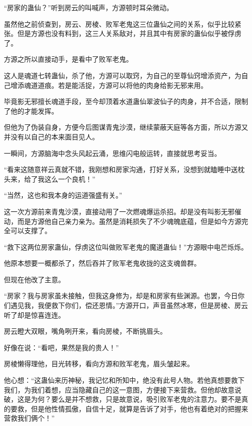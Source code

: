 
\begin{this_body}



“房家的蛊仙？”听到房云的叫喊声，方源顿时耳朵微动。

虽然他之前侦查到，房云、房棱、败军老鬼这三位蛊仙之间的关系，似乎比较紧张。但是方源也没有料到，这三人关系敌对，并且其中有房家的蛊仙似乎被俘虏了。

方源之所以直接动手，是看中了败军老鬼。

这人是魂道七转蛊仙，杀了他，方源可以取窍，为自己的至尊仙窍增添资产，为自己增添魂道道痕。若是能活捉，方源可以将他的肉身给影无邪来用。

毕竟影无邪擅长魂道手段，至今却顶着水道蛊仙翠波仙子的肉身，并不合适，限制了他的才能发挥。

但他为了伪装自身，方便今后图谋青鬼沙漠，继续蒙蔽天庭等各方面，所以方源又并没有以自己的本来面目见人。

一瞬间，方源脑海中念头风起云涌，思维闪电般运转，直接就思考妥当。

“看来这随意祥云真就不错，我刚想和房家沟通，打好关系，没想到就瞌睡中送枕头来，给了我这么一个良机！”

“当然，这也和我本身的运道强盛有关。”

这一次方源前来青鬼沙漠，直接动用了一次燃魂爆运杀招。却是没有叫影无邪催动，而是方源他自己亲力亲为。虽然是消耗损失了不少魂魄底蕴，但是如今方源完全可以支撑了。

“救下这两位房家蛊仙，俘虏这位叫做败军老鬼的魔道蛊仙！”方源眼中电芒烁烁。

他原本想要一概都杀了，然后吞并了败军老鬼收拢的这支魂兽群。

但现在他改了主意。

“房家？我与房家虽未接触，但我这身修为，却是和房家有些渊源。也罢，今日你们遇见我，我便救下你们，偿还恩情。”方源开口，声音虽然冰寒，但是房棱、房云听了却是惊喜连连。

房云瞪大双眼，嘴角咧开来，看向房棱，不断挑眉头。

好像在说：“看吧，果然是我的贵人！”

房棱懒得理他，目光转移，看向方源和败军老鬼，眉头皱起来。

他心想：“这蛊仙来历神秘，我记忆和所知中，绝没有此号人物。若他真想要救下我们，为我们着想，应当隐藏自己的这一意图，方便接下来营救。但他却故意说破，这是为何？要么是并不想救，只是故意说，吸引败军老鬼的注意力。要不是真的要救，但是他性情孤傲，自信十足，就算是告诉了对手，他也有着绝对的把握来营救我们俩个！”


\end{this_body}
